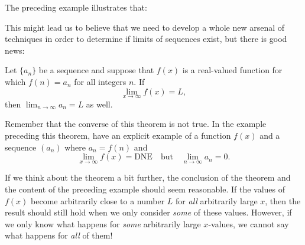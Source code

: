 \documentclass{ximera}
\begin{document}
The preceding example illustrates that:

\begin{multipleChoice}
\end{multipleChoice}

This might lead us to believe that we need to develop a whole new arsenal of techniques in order to determine if limits of sequences exist, but there is good news:

\begin{theorem}
  Let $\{a_n\}$ be a sequence and suppose that $f(x)$ is a real-valued function for which $f(n) = a_n$ for all integers $n$.  If
  \[
  \lim_{x\to\infty}f(x)=L,
  \]
  then $\lim_{n\to\infty} a_n=L$ as well.
\end{theorem}

\begin{warning}
Remember that the converse of this theorem is not
true.  In the example preceding this theorem, have an explicit example of a function $f(x)$ and a sequence $(a_n)$ where $a_n
=f(n)$ and
\[
\lim_{x\to\infty}f(x)=\text{DNE} \quad\text{but} \quad \lim_{n\to\infty} a_n = 0.
\]

\end{warning}

If we think about the theorem a bit further, the conclusion  of the theorem and the content of the preceding example should seem reasonable.  If the values of $f(x)$ become arbitrarily close to a number $L$ for \emph{all} arbitrarily large $x$, then the result should still hold when we only consider \emph{some} of these values.  However, if we only know what happens for \emph{some} arbitrarily large $x$-values, we cannot say what happens for \emph{all} of them!

%
\end{document}
